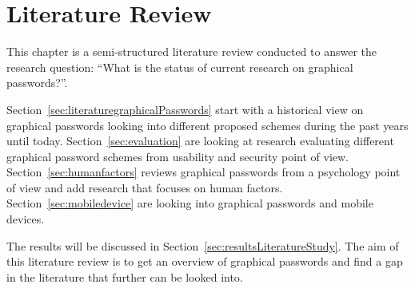 \chapter{Literature Review}

  This chapter is a semi-structured literature review conducted to answer the research question: ``What is the status of current research on graphical passwords?''. 

  Section~\ref{sec:literaturegraphicalPasswords} start with a historical view on graphical passwords looking into different proposed schemes during the past years until today. Section~\ref{sec:evaluation} are looking at research evaluating different graphical password schemes from usability and security point of view. Section~\ref{sec:humanfactors} reviews graphical passwords from a psychology point of view and add research that focuses on human factors. Section~\ref{sec:mobiledevice} are looking into graphical passwords and mobile devices. 

  The results will be discussed in Section~\ref{sec:resultsLiteratureStudy}. The aim of this literature review is to get an overview of graphical passwords and find a gap in the literature that further can be looked into. 

